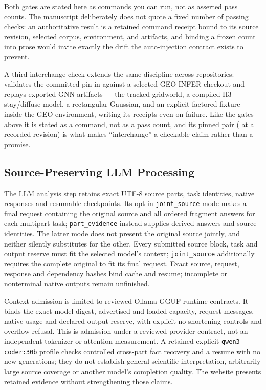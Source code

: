 \documentclass[
  english,
  9pt,
]{extarticle}
\begin{document}
Both gates are stated here as commands you can run, not as asserted pass
counts. The manuscript deliberately does not quote a fixed number of
passing checks: an authoritative result is a retained command receipt
bound to its source revision, selected corpus, environment, and
artifacts, and binding a frozen count into prose would invite exactly
the drift the auto-injection contract exists to prevent.

A third interchange check extends the same discipline across
repositories: 
validates the committed pin in  against a
selected GEO-INFER checkout and replays exported GNN artifacts --- the
tracked gridworld, a compiled H3 stay/diffuse model, a rectangular
Gaussian, and an explicit factored fixture --- inside the GEO
environment, writing its receipts even on failure. Like the gates above
it is stated as a command, not as a pass count, and its pinned pair
( at a recorded revision) is
what makes ``interchange'' a checkable claim rather than a promise.

\subsection{Source-Preserving LLM
Processing}\label{source-preserving-llm-processing}

The LLM analysis step retains exact UTF-8 source parts, task identities,
native responses and resumable checkpoints. Its opt-in
\texttt{joint\_source} mode makes a final request containing the
original source and all ordered fragment answers for each multipart
task; \texttt{part\_evidence} instead supplies derived answers and
source identities. The latter mode does not present the original source
jointly, and neither silently substitutes for the other. Every submitted
source block, task and output reserve must fit the selected model's
context; \texttt{joint\_source} additionally requires the complete
original to fit its final request. Exact source, request, response and
dependency hashes bind cache and resume; incomplete or nonterminal
native outputs remain unfinished.

Context admission is limited to reviewed Ollama GGUF runtime contracts.
It binds the exact model digest, advertised and loaded capacity, request
messages, native usage and declared output reserve, with explicit
no-shortening controls and overflow refusal. This is admission under a
reviewed provider contract, not an independent tokenizer or attention
measurement. A retained explicit \texttt{qwen3-coder:30b} profile checks
controlled cross-part fact recovery and a resume with no new
generations; they do not establish general scientific interpretation,
arbitrarily large source coverage or another model's completion quality.
The website presents retained evidence without strengthening those
claims.
\end{document}
